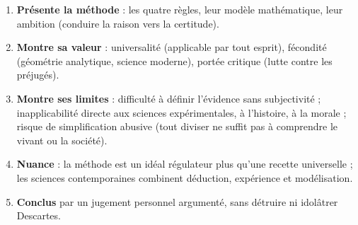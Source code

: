 \documentclass[11pt]{article}
\begin{document}
\begin{methode}
\begin{enumerate}
\item \textbf{Présente la méthode} : les quatre règles, leur modèle mathématique, leur ambition (conduire la raison vers la certitude).
\item \textbf{Montre sa valeur} : universalité (applicable par tout esprit), fécondité (géométrie analytique, science moderne), portée critique (lutte contre les préjugés).
\item \textbf{Montre ses limites} : difficulté à définir l'évidence sans subjectivité ; inapplicabilité directe aux sciences expérimentales, à l'histoire, à la morale ; risque de simplification abusive (tout diviser ne suffit pas à comprendre le vivant ou la société).
\item \textbf{Nuance} : la méthode est un idéal régulateur plus qu'une recette universelle ; les sciences contemporaines combinent déduction, expérience et modélisation.
\item \textbf{Conclus} par un jugement personnel argumenté, sans détruire ni idolâtrer Descartes.
\end{enumerate}
\end{methode}
\end{document}

